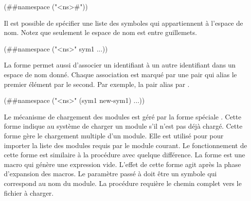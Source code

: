 \begin{center}
  \begin{mplisting}{0.8}
(##namespace ("<ns>#"))
\end{mplisting}
\end{center}

Il est possible de spécifier une liste des symboles qui appartiennent à
l'espace de nom. Notez que seulement le espace de nom est entre guillemets.

\begin{center}
  \begin{mplisting}{0.8}
(##namespace ("<ns>" sym1 ...))
\end{mplisting}
\end{center}

La forme  permet aussi d'associer un identifiant à un
autre identifiant dans un espace de nom donné. Chaque association est marqué
par une pair qui alias le premier élément par le second. Par exemple, la pair
 alias  par .

\begin{center}
  \begin{mplisting}{0.6}
(##namespace ("<ns>" (sym1 new-sym1) ...))
\end{mplisting}
\end{center}




Le mécanisme de chargement des modules est géré par la forme spéciale
. Cette forme indique au système de charger un module
s'il n'est pas déjà chargé. Cette forme gère le chargement multiple d'un
module. Elle est utilisé pour pour importer la liste des modules requis par le
module courant.  Le fonctionnement de cette forme est similaire à la procédure
 avec quelque différence. La forme  est
une macro qui génère une expression vide. L'effet de cette forme agit après la
phase d'expansion des macros. Le paramètre passé à 
doit être un symbole qui correspond au nom du module. La procédure 
requière le chemin complet vers le fichier à charger.

